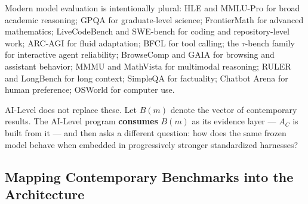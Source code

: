 \documentclass[11pt]{article}
\theoremstyle{definition}
\begin{document}
Modern model evaluation is intentionally plural: HLE \citep{phan2025hle} and MMLU-Pro \citep{wang2024mmlupro} for broad academic reasoning; GPQA \citep{rein2023gpqa} for graduate-level science; FrontierMath \citep{glazer2024frontiermath} for advanced mathematics; LiveCodeBench \citep{jain2024livecodebench} and SWE-bench \citep{jimenez2023swebench} for coding and repository-level work; ARC-AGI \citep{arc2026} for fluid adaptation; BFCL \citep{patil2025bfcl} for tool calling; the $\tau$-bench family \citep{yao2024taubench} for interactive agent reliability; BrowseComp \citep{wei2025browsecomp} and GAIA \citep{mialon2023gaia} for browsing and assistant behavior; MMMU \citep{yue2023mmmu} and MathVista \citep{lu2023mathvista} for multimodal reasoning; RULER \citep{hsieh2024ruler} and LongBench \citep{bai2024longbench} for long context; SimpleQA \citep{openai2024simpleqa} for factuality; Chatbot Arena \citep{chiang2024arena} for human preference; OSWorld \citep{xie2024osworld} for computer use.

AI-Level does not replace these. Let $B(m)$ denote the vector of contemporary results. The AI-Level program \textbf{consumes} $B(m)$ as its evidence layer --- $A_C$ is built from it --- and then asks a different question: how does the same frozen model behave when embedded in progressively stronger standardized harnesses?

\subsection{Mapping Contemporary Benchmarks into the Architecture}
\end{document}
